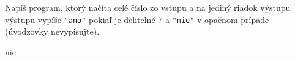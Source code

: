 




Napíš program, ktorý načíta celé číslo zo vstupu a na jediný riadok výstupu výstupu vypíše
\texttt{"ano"} pokiaľ je delitelné $7$ a \texttt{"nie"} v opačnom prípade (úvodzovky nevypisujte).

\vystup
nie
\koniec



